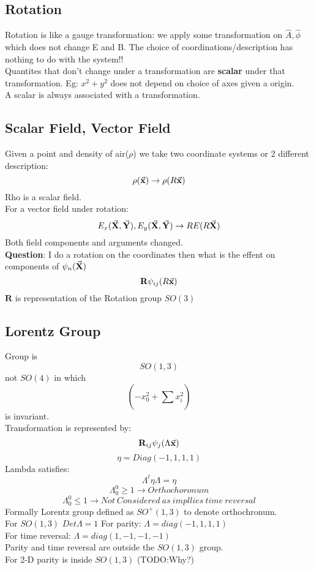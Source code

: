 \documentclass{scrartcl}
\begin{document}
\subsection{Rotation}
Rotation is like a gauge transformation: we apply some transformation on \( \hat{A}, \hat{\phi} \) which does not change E and B. The choice of coordinations/description has nothing to do with the system!!\\
Quantites that don't change under a transformation are \textbf{scalar} under that transformation.
Eg: \( x^2 + y^2 \) does not depend on choice of axes given a origin.\\
A scalar is always associated with a transformation.
\subsection{Scalar Field, Vector Field}
Given a point and density of air(\( \rho \)) we take two coordinate systems or 2 different description:
\[ \rho(\va{x}) \rightarrow \rho(R \va{x}) \]
Rho is a scalar field.\\
For a vector field under rotation:
\[ E_x(\va{X},\va{Y}) , E_y(\va{X},\va{Y}) \rightarrow R E(R \va{X}) \]
Both field components and arguments changed.\\
\textbf{Question}: I do a rotation on the coordinates then what is the effent on components of \( \psi_n(\va{X}) \)\\
\[ \mathbf{R} \psi_{ij}(R \va{x}) \]
\( \mathbf{R} \) is representation of the Rotation group \( SO(3) \)
\subsection{Lorentz Group}
Group is \[ SO(1,3)\] not \( SO(4) \)
in which \[ (-x_0^2 + \displaystyle\sum_{}^{} x_i^2) \]
is invariant.\\
Transformation is represented by:
\[ \mathbf{R}_{ij} \psi_j ( \Lambda \va{x}) \]
\begin{equation}
	\eta = Diag(-1,1,1,1)
	\label{eq:mmatrix}
\end{equation}
Lambda satisfies:
\[ \Lambda^t \eta \Lambda = \eta \]
\[ \Lambda_0^0 \geq 1 \rightarrow Orthochoronum \]
\[ \Lambda_0^0 \leq 1 \rightarrow Not\ Considered\ as\ impllies\ time\ reversal \]
Formally Lorentz group defined as \( SO^+ ( 1,3) \) to denote orthochronum.\\
For \( SO(1,3) \) \( Det \Lambda = 1 \)
For parity: \( \Lambda = diag(-1,1,1,1) \)\\
For time reversal: \( \Lambda = diag(1,-1,-1,-1) \)\\
Parity and time reversal are outside the \( SO(1,3) \) group.\\
For 2-D parity is inside \( SO(1,3) \) (TODO:Why?)
\end{document}
